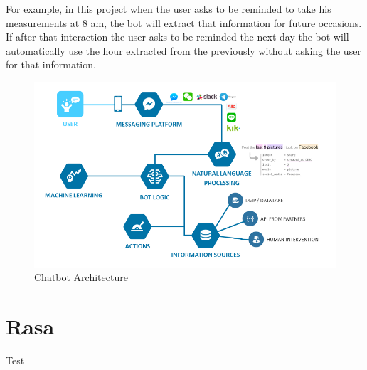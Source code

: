 For example, in this project when the user asks to be reminded to take his measurements at 8 am, the bot will extract that information for future occasions. If after that interaction the user asks to be reminded the next day the bot will automatically use the hour extracted from the previously without asking the user for that information.\\

\begin{center}
	\begin{figure}[h!]
		\centering
		\includegraphics[scale=0.6]{./images/3-cha-struct}
		\caption{Chatbot Architecture}
		\label{cha_struct}
	\end{figure}
\end{center}

\section{Rasa}\label{sec:chap3_rasa}
Test






